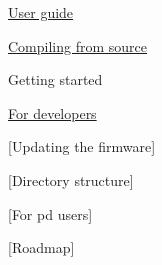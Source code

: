 
\begin{DoxyItemize}
\item \hyperlink{axo_gui}{User guide}
\item \hyperlink{compile}{Compiling from source}
\item Getting started 
\item \hyperlink{developers}{For developers}
\item \mbox{[}Updating the firmware\mbox{]}
\item \mbox{[}Directory structure\mbox{]}
\item \mbox{[}For pd users\mbox{]} 
\item \mbox{[}Roadmap\mbox{]} 
\end{DoxyItemize}